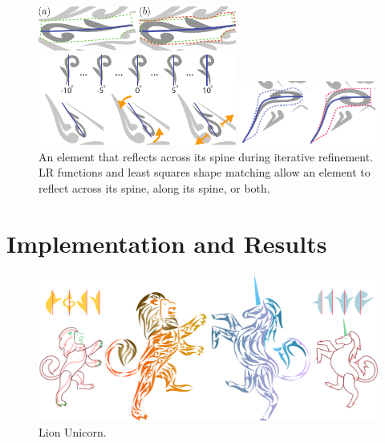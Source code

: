 \begin{figure}[t]
\centering
\includegraphics[width=6.5cm]{figures/flowpak/stretch.pdf}
\caption{\label{stretch_ornament}
(a) An elementt with its sub-region blob shown in dashed green line. Note that any blob is constrained by the neighboring elements. (b) The dashed red line is the grown blob, which accommodates an enlarged element.}

\medskip
\includegraphics[width=6.5cm]{figures/flowpak/rotate_ornament.pdf}
\caption{\label{rotate_ornament}
Top row: rotated versions of the original element. 
         The best rotation angle is chosen via least squares matching.
         Bottom row: original, rotated, and enlarged versions of an element.}

\medskip
\includegraphics[width=4.5cm]{figures/flowpak/flip.pdf}
\caption{\label{flip_shape}
An element that reflects across its spine during iterative refinement.
LR functions and least squares shape matching allow an element to reflect
across its spine, along its spine, or both.}
\end{figure}

\section{Implementation and Results}

\begin{figure}
\centering
\includegraphics[width=1.0\textwidth]{figures/flowpak/lion_unicorn.pdf} 
\caption{\label{fig_lion_unicorn} 
Lion Unicorn. }
\end{figure}

